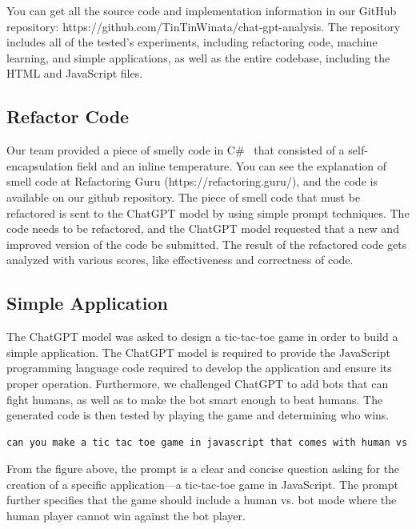 \documentclass[conference]{IEEEtran}
\begin{document}
You can get all the source code and implementation information in our GitHub repository: https://github.com/TinTinWinata/chat-gpt-analysis. The repository includes all of the tested's experiments, including refactoring code, machine learning, and simple applications, as well as the entire codebase, including the HTML and JavaScript files.

\subsection{Refactor Code}
Our team provided a piece of smelly code in C\#  that consisted of a self-encapsulation field and an inline temperature. You can see the explanation of smell code at Refactoring Guru (https://refactoring.guru/), and the code is available on our github repository. The piece of smell code that must be refactored is sent to the ChatGPT model by using simple prompt techniques. The code needs to be refactored, and the ChatGPT model requested that a new and improved version of the code be submitted. The result of the refactored code gets analyzed with various scores, like effectiveness and correctness of code. 


\subsection{Simple Application}
The ChatGPT model was asked to design a tic-tac-toe game in order to build a simple application. The ChatGPT model is required to provide the JavaScript programming language code required to develop the application and ensure its proper operation. Furthermore, we challenged ChatGPT to add bots that can fight humans, as well as to make the bot smart enough to beat humans. The generated code is then tested by playing the game and determining who wins.

\vspace{0pt}
\begin{lstlisting}[caption={Simple Application Prompt}, basicstyle=\ttfamily,language=TeX]
can you make a tic tac toe game in javascript that comes with human vs bot game, where the human cannot win against the bot
\end{lstlisting}

From the figure above, the prompt is a clear and concise question asking for the creation of a specific application—a tic-tac-toe game in JavaScript. The prompt further specifies that the game should include a human vs. bot mode where the human player cannot win against the bot player.
\end{document}
